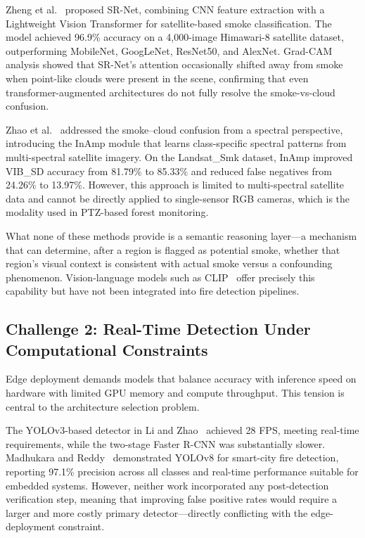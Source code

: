 \documentclass[11pt,twocolumn]{article}
\begin{document}
Zheng et al.~\cite{cnn_vit_smoke} proposed SR-Net, combining CNN feature extraction with a Lightweight Vision Transformer for satellite-based smoke classification. The model achieved 96.9\% accuracy on a 4,000-image Himawari-8 satellite dataset, outperforming MobileNet, GoogLeNet, ResNet50, and AlexNet. Grad-CAM analysis showed that SR-Net's attention occasionally shifted away from smoke when point-like clouds were present in the scene, confirming that even transformer-augmented architectures do not fully resolve the smoke-vs-cloud confusion.

Zhao et al.~\cite{spectral_smoke} addressed the smoke--cloud confusion from a spectral perspective, introducing the InAmp module that learns class-specific spectral patterns from multi-spectral satellite imagery. On the Landsat\_Smk dataset, InAmp improved VIB\_SD accuracy from 81.79\% to 85.33\% and reduced false negatives from 24.26\% to 13.97\%. However, this approach is limited to multi-spectral satellite data and cannot be directly applied to single-sensor RGB cameras, which is the modality used in PTZ-based forest monitoring.

What none of these methods provide is a semantic reasoning layer---a mechanism that can determine, after a region is flagged as potential smoke, whether that region's visual context is consistent with actual smoke versus a confounding phenomenon. Vision-language models such as CLIP~\cite{clip} offer precisely this capability but have not been integrated into fire detection pipelines.

\subsection{Challenge 2: Real-Time Detection Under Computational Constraints}

Edge deployment demands models that balance accuracy with inference speed on hardware with limited GPU memory and compute throughput. This tension is central to the architecture selection problem.

The YOLOv3-based detector in Li and Zhao~\cite{cnn_fire_detection} achieved 28 FPS, meeting real-time requirements, while the two-stage Faster R-CNN was substantially slower. Madhukara and Reddy~\cite{yolov8_smartcity} demonstrated YOLOv8 for smart-city fire detection, reporting 97.1\% precision across all classes and real-time performance suitable for embedded systems. However, neither work incorporated any post-detection verification step, meaning that improving false positive rates would require a larger and more costly primary detector---directly conflicting with the edge-deployment constraint.
\end{document}
